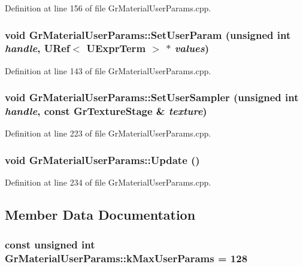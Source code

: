 Definition at line 156 of file GrMaterialUserParams.cpp.\hypertarget{class_gr_material_user_params_be8eb5892d04d99258233fd049531f23}{
\subsubsection[{SetUserParam}]{\setlength{\rightskip}{0pt plus 5cm}void GrMaterialUserParams::SetUserParam (unsigned int {\em handle}, \/  {\bf URef}$<$ {\bf UExprTerm} $>$ $\ast$ {\em values})}}
\label{class_gr_material_user_params_be8eb5892d04d99258233fd049531f23}




Definition at line 143 of file GrMaterialUserParams.cpp.\hypertarget{class_gr_material_user_params_a661de3e2b9b34e6a8713be6f64d899a}{
\subsubsection[{SetUserSampler}]{\setlength{\rightskip}{0pt plus 5cm}void GrMaterialUserParams::SetUserSampler (unsigned int {\em handle}, \/  const {\bf GrTextureStage} \& {\em texture})}}
\label{class_gr_material_user_params_a661de3e2b9b34e6a8713be6f64d899a}




Definition at line 223 of file GrMaterialUserParams.cpp.\hypertarget{class_gr_material_user_params_fd456a4ffa7efb1616507100d66e0306}{
\subsubsection[{Update}]{\setlength{\rightskip}{0pt plus 5cm}void GrMaterialUserParams::Update ()}}
\label{class_gr_material_user_params_fd456a4ffa7efb1616507100d66e0306}




Definition at line 234 of file GrMaterialUserParams.cpp.

\subsection{Member Data Documentation}
\hypertarget{class_gr_material_user_params_ff25d4f01e95a3645d6e0104d37d72de}{
\subsubsection[{kMaxUserParams}]{\setlength{\rightskip}{0pt plus 5cm}const unsigned int {\bf GrMaterialUserParams::kMaxUserParams} = 128}}
\label{class_gr_material_user_params_ff25d4f01e95a3645d6e0104d37d72de}




